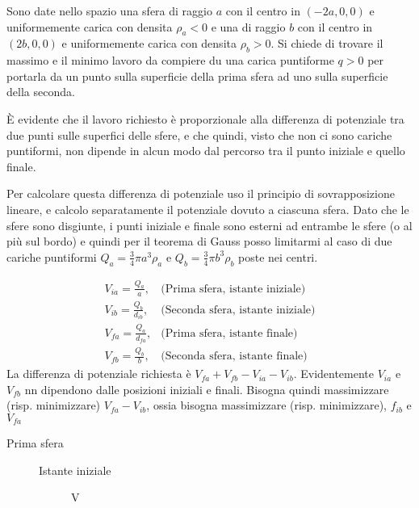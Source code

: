 \documentclass[../main.tex]{subfiles}
\begin{document}

\textex
Sono date nello spazio una sfera di raggio $a$ con il centro in $(-2a,0,0)$ e uniformemente carica con densita $\rho_a<0$ e una di raggio $b$ con il centro in $(2b,0,0)$ e uniformemente carica con densita $\rho_b>0$. Si chiede di trovare il massimo e il minimo lavoro da compiere du una carica puntiforme $q>0$ per portarla da un punto sulla superficie della prima sfera ad uno sulla superficie della seconda.

\solution
\`E evidente che il lavoro richiesto \`e proporzionale alla differenza di potenziale tra due punti sulle superfici delle sfere, e che quindi, visto che non ci sono cariche puntiformi, non dipende in alcun modo dal percorso tra il punto iniziale e quello finale.

Per calcolare questa differenza di potenziale uso il principio di sovrapposizione lineare, e calcolo separatamente il potenziale dovuto a ciascuna sfera. Dato che le sfere sono disgiunte, i punti iniziale e finale sono esterni ad entrambe le sfere (o al pi\`u sul bordo) e quindi per il teorema di Gauss posso limitarmi al caso di due cariche puntiformi $Q_a=\frac{3}{4} \pi a^3 \rho_a $ e $Q_b=\frac{3}{4} \pi b^3 \rho_b $  poste nei centri.

\begin{subequations}
  \label{dsc:potenziali}
  \begin{align}
      V_{ia}=\frac{Q_a}{a},	& \text{(Prima sfera, istante iniziale)} \\
      V_{ib}=\frac{Q_b}{d_{ib}},	& \text{(Seconda sfera, istante iniziale)} \\
      V_{fa}=\frac{Q_a}{d_{fa}},	& \text{(Prima sfera, istante finale)} \\
      V_{fb}=\frac{Q_b}{b},	& \text{(Seconda sfera, istante finale)}
  \end{align}
\end{subequations}
La differenza di potenziale richiesta \`e $V_{fa}+V_{fb}-V_{ia}-V_{ib}$.
Evidentemente $V_{ia}$ e $V_{fb}$ nn dipendono dalle posizioni iniziali e finali. Bisogna quindi massimizzare (risp. minimizzare) $V_{fa}-V_{ib}$, ossia bisogna massimizzare (risp. minimizzare), $f_{ib}$ e $V_{fa}$


\begin{description}
\item[Prima sfera]
  \begin{description}
  \item[Istante iniziale]

    V
  \end{description}




\end{description}
\end{document}
